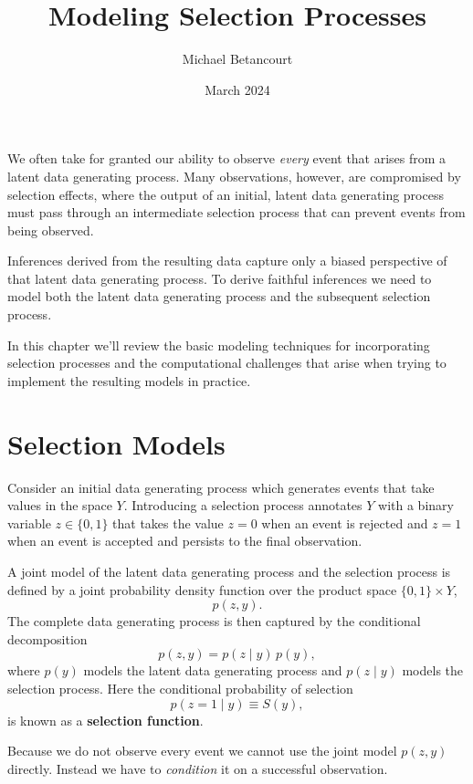 \documentclass[
  letterpaper,
  DIV=11,
  numbers=noendperiod]{scrartcl}
\title{Modeling Selection Processes}
\author{Michael Betancourt}
\date{March 2024}
\renewcommand*\contentsname{Table of contents}
\newcommand\contentsname{Table of contents}
\begin{document}
\maketitle

\renewcommand*\contentsname{Table of contents}
{
\hypersetup{linkcolor=}
\setcounter{tocdepth}{3}
\tableofcontents
}
We often take for granted our ability to observe \emph{every} event that
arises from a latent data generating process. Many observations,
however, are compromised by selection effects, where the output of an
initial, latent data generating process must pass through an
intermediate selection process that can prevent events from being
observed.

Inferences derived from the resulting data capture only a biased
perspective of that latent data generating process. To derive faithful
inferences we need to model both the latent data generating process and
the subsequent selection process.

In this chapter we'll review the basic modeling techniques for
incorporating selection processes and the computational challenges that
arise when trying to implement the resulting models in practice.

\section{Selection Models}\label{selection-models}

Consider an initial data generating process which generates events that
take values in the space \(Y\). Introducing a selection process
annotates \(Y\) with a binary variable \(z \in \{0, 1\}\) that takes the
value \(z = 0\) when an event is rejected and \(z = 1\) when an event is
accepted and persists to the final observation.

A joint model of the latent data generating process and the selection
process is defined by a joint probability density function over the
product space \(\{0, 1\} \times Y\), \[
p(z, y).
\] The complete data generating process is then captured by the
conditional decomposition \[
p(z, y) = p(z \mid y) \, p(y),
\] where \(p(y)\) models the latent data generating process and
\(p(z \mid y)\) models the selection process. Here the conditional
probability of selection \[
p(z = 1 \mid y) \equiv S(y),
\] is known as a \textbf{selection function}.

Because we do not observe every event we cannot use the joint model
\(p(z, y)\) directly. Instead we have to \emph{condition} it on a
successful observation.
\end{document}
